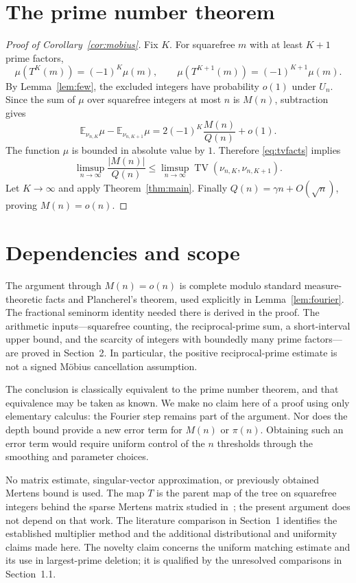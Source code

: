 \documentclass[11pt]{article}
\theoremstyle{remark}\newtheorem{remark}[theorem]{Remark}
\DeclareMathOperator{\TV}{TV}
\newcommand{\E}{\mathbb E}
\begin{document}
\section{The prime number theorem}

\begin{proof}[Proof of Corollary~\ref{cor:mobius}]
Fix $K$. For squarefree $m$ with at least $K+1$ prime factors,
\[
 \mu(T^K(m))=(-1)^K\mu(m),\qquad
 \mu(T^{K+1}(m))=(-1)^{K+1}\mu(m).
\]
By Lemma~\ref{lem:few}, the excluded integers have probability $o(1)$ under $U_n$. Since the sum of $\mu$ over squarefree integers at most $n$ is $M(n)$, subtraction gives
\[
 \E_{\nu_{n,K}}\mu-\E_{\nu_{n,K+1}}\mu
 =2(-1)^K\frac{M(n)}{Q(n)}+o(1).
\]
The function $\mu$ is bounded in absolute value by $1$. Therefore \eqref{eq:tvfacts} implies
\[
 \limsup_{n\to\infty}\frac{|M(n)|}{Q(n)}
 \le\limsup_{n\to\infty}\TV(\nu_{n,K},\nu_{n,K+1}).
\]
Let $K\to\infty$ and apply Theorem~\ref{thm:main}. Finally $Q(n)=\gamma n+O(\sqrt n)$, proving $M(n)=o(n)$.
\end{proof}

\section{Dependencies and scope}

The argument through $M(n)=o(n)$ is complete modulo standard measure-theoretic facts and Plancherel's theorem, used explicitly in Lemma~\ref{lem:fourier}. The fractional seminorm identity needed there is derived in the proof. The arithmetic inputs---squarefree counting, the reciprocal-prime sum, a short-interval upper bound, and the scarcity of integers with boundedly many prime factors---are proved in Section~2. In particular, the positive reciprocal-prime estimate is not a signed M\"obius cancellation assumption.

The conclusion is classically equivalent to the prime number theorem, and that equivalence may be taken as known. We make no claim here of a proof using only elementary calculus: the Fourier step remains part of the argument. Nor does the depth bound provide a new error term for $M(n)$ or $\pi(n)$. Obtaining such an error term would require uniform control of the $n$ thresholds through the smoothing and parameter choices.

No matrix estimate, singular-vector approximation, or previously obtained Mertens bound is used. The map $T$ is the parent map of the tree on squarefree integers behind the sparse Mertens matrix studied in~\cite{KlineSpectrum}; the present argument does not depend on that work. The literature comparison in Section~1 identifies the established multiplier method and the additional distributional and uniformity claims made here. The novelty claim concerns the uniform matching estimate and its use in largest-prime deletion; it is qualified by the unresolved comparisons in Section~1.1.
\end{document}
